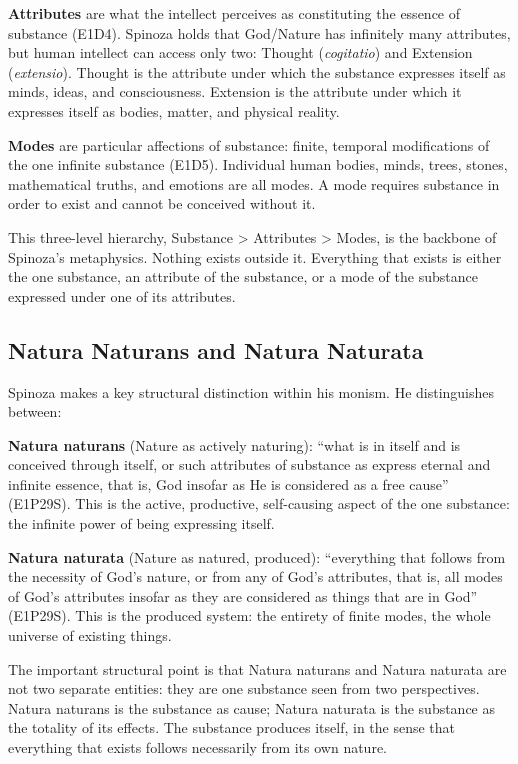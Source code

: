 \documentclass[12pt]{article}
\begin{document}
\textbf{Attributes} are what the intellect perceives as constituting the
essence of substance (E1D4). Spinoza holds that God/Nature has
infinitely many attributes, but human intellect can access only two:
Thought (\emph{cogitatio}) and Extension (\emph{extensio}). Thought is
the attribute under which the substance expresses itself as minds,
ideas, and consciousness. Extension is the attribute under which it
expresses itself as bodies, matter, and physical reality.

\textbf{Modes} are particular affections of substance: finite, temporal
modifications of the one infinite substance (E1D5). Individual human
bodies, minds, trees, stones, mathematical truths, and emotions are all
modes. A mode requires substance in order to exist and cannot be
conceived without it.

This three-level hierarchy, Substance \textgreater{} Attributes
\textgreater{} Modes, is the backbone of Spinoza's metaphysics. Nothing
exists outside it. Everything that exists is either the one substance,
an attribute of the substance, or a mode of the substance expressed
under one of its attributes.

\subsection{Natura Naturans and Natura Naturata}\label{natura-naturans-and-natura-naturata}

Spinoza makes a key structural distinction within his monism. He
distinguishes between:

\textbf{Natura naturans} (Nature as actively naturing): ``what is in
itself and is conceived through itself, or such attributes of substance
as express eternal and infinite essence, that is, God insofar as He is
considered as a free cause'' (E1P29S). This is the active, productive,
self-causing aspect of the one substance: the infinite power of being
expressing itself.

\textbf{Natura naturata} (Nature as natured, produced): ``everything
that follows from the necessity of God's nature, or from any of God's
attributes, that is, all modes of God's attributes insofar as they are
considered as things that are in God'' (E1P29S). This is the produced
system: the entirety of finite modes, the whole universe of existing
things.

The important structural point is that Natura naturans and Natura
naturata are not two separate entities: they are one substance seen from
two perspectives. Natura naturans is the substance as cause; Natura
naturata is the substance as the totality of its effects. The substance
produces itself, in the sense that everything that exists follows
necessarily from its own nature.
\end{document}
